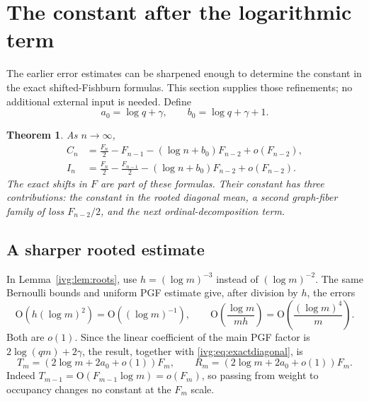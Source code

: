 \documentclass[11pt,letterpaper]{article}
\newtheorem{theorem}{Theorem}[section]
\theoremstyle{definition}\newtheorem{definition}[theorem]{Definition}
\theoremstyle{remark}\newtheorem{remark}[theorem]{Remark}
\newcommand{\OO}{\mathrm O}
\begin{document}
\section{The constant after the logarithmic term}\label{ivg:sec:constant}
The earlier error estimates can be sharpened enough to determine the constant in the exact shifted-Fishburn formulas. This section supplies those refinements; no additional external input is needed. Define
\begin{equation}\label{ivg:eq:bconstant}
 a_0=\log q+\gamma,\qquad b_0=\log q+\gamma+1.
\end{equation}
\begin{theorem}\label{ivg:thm:constant}
As $n\to\infty$,
\begin{align}
 C_n&=\frac{F_n}{2}-F_{n-1}-(\log n+b_0)F_{n-2}+o(F_{n-2}),\label{ivg:eq:Csharp}\\
 I_n&=\frac{F_n}{2}-\frac{F_{n-1}}2-(\log n+b_0)F_{n-2}+o(F_{n-2}).\label{ivg:eq:Isharp}
\end{align}
The exact shifts in $F$ are part of these formulas. Their constant has three contributions: the constant in the rooted diagonal mean, a second graph-fiber family of loss $F_{n-2}/2$, and the next ordinal-decomposition term.
\end{theorem}

\subsection{A sharper rooted estimate}
In Lemma~\ref{ivg:lem:roots}, use $h=(\log m)^{-3}$ instead of $(\log m)^{-2}$. The same Bernoulli bounds and uniform PGF estimate give, after division by $h$, the errors
\[
 \OO(h(\log m)^2)=\OO((\log m)^{-1}),\qquad
 \OO\!\left(\frac{\log m}{mh}\right)=\OO\!\left(\frac{(\log m)^4}{m}\right).
\]
Both are $o(1)$. Since the linear coefficient of the main PGF factor is $2\log(qm)+2\gamma$, the result, together with \eqref{ivg:eq:exactdiagonal}, is
\begin{equation}\label{ivg:eq:rootconstant}
 T_m=(2\log m+2a_0+o(1))F_m,\qquad
 R_m=(2\log m+2a_0+o(1))F_m.
\end{equation}
Indeed $T_{m-1}=\OO(F_{m-1}\log m)=o(F_m)$, so passing from weight to occupancy changes no constant at the $F_m$ scale.
\end{document}
